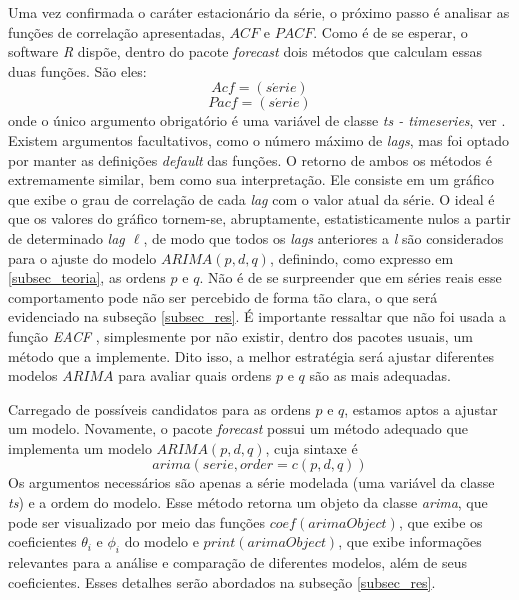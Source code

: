 \documentclass[12pt]{article}
\begin{document}
Uma vez confirmada o caráter estacionário da série, o próximo passo é analisar as funções de correlação apresentadas, $ACF$ e $PACF$. Como é de se esperar, o software \emph{R} dispõe, dentro do pacote \emph{forecast} dois métodos que calculam essas duas funções. São eles:
\begin{equation*}
Acf=(s\acute{e}rie)
\end{equation*}
\begin{equation*}
Pacf=(s\acute{e}rie)
\end{equation*}
onde o único argumento obrigatório é uma variável de classe \emph{ts - timeseries}, ver \cite{CRANR}. Existem argumentos facultativos, como o número máximo de \textit{lags}, mas foi optado por manter as definições \textit{default} das funções. O retorno de ambos os métodos é extremamente similar, bem como sua interpretação. Ele consiste em um gráfico que exibe o grau de correlação de cada \textit{lag} com o valor atual da série. O ideal é que os valores do gráfico tornem-se, abruptamente, estatisticamente nulos a partir de determinado \textit{lag {$\ell$}}, de modo que todos os \textit{lags} anteriores a \textit{l} são considerados para o ajuste do modelo $ARIMA(p,d,q)$, definindo, como expresso em \ref{subsec_teoria}, as ordens $p$ e $q$. Não é de se surpreender que em séries reais esse comportamento pode não ser percebido de forma tão clara, o que será evidenciado na subseção \ref{subsec_res}. É importante ressaltar que não foi usada a função \emph{EACF} \cite{Tsay-Tiao1984}, simplesmente por não existir, dentro dos pacotes usuais, um método que a implemente. Dito isso, a melhor estratégia será ajustar diferentes modelos $ARIMA$ para avaliar quais ordens $p$ e $q$ são as mais adequadas.

Carregado de possíveis candidatos para as ordens $p$ e $q$, estamos aptos a ajustar um modelo. Novamente, o pacote \emph{forecast} possui um método adequado que implementa um modelo $ARIMA(p,d,q)$, cuja sintaxe é
\begin{equation*}
arima(serie, order = c(p,d,q))
\end{equation*}
Os argumentos necessários são apenas a série modelada (uma variável da classe \textit{ts}) e a ordem do modelo. Esse método retorna um objeto da classe \textit{arima}, que pode ser visualizado por meio das funções $coef(arimaObject)$, que exibe os coeficientes $\theta_{i}$ e $\phi_{i}$ do modelo e $print(arimaObject)$, que exibe informações relevantes para a análise e comparação de diferentes modelos, além de seus coeficientes. Esses detalhes serão abordados na subseção \ref{subsec_res}.
\end{document}
